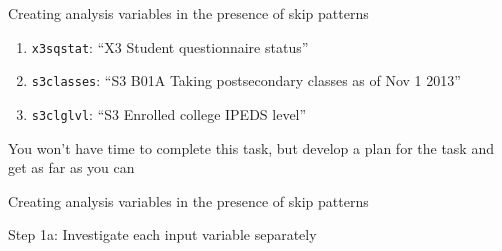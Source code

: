 \documentclass[8pt,ignorenonframetext,dvipsnames]{beamer}
\newenvironment{Shaded}{\begin{snugshade}}{\end{snugshade}}
\newcommand{\KeywordTok}[1]{\textcolor[rgb]{0.13,0.29,0.53}{\textbf{#1}}}
\newcommand{\StringTok}[1]{\textcolor[rgb]{0.31,0.60,0.02}{#1}}
\newcommand{\CommentTok}[1]{\textcolor[rgb]{0.56,0.35,0.01}{\textit{#1}}}
\newcommand{\OperatorTok}[1]{\textcolor[rgb]{0.81,0.36,0.00}{\textbf{#1}}}
\newcommand{\NormalTok}[1]{#1}
\providecommand{\tightlist}{%
  \setlength{\itemsep}{0pt}\setlength{\parskip}{0pt}}
\renewcommand{\textbf}[1]{{\color{darkgray}\bfseries\fontfamily{Montserrat-TOsF}#1}}
\begin{document}
\begin{frame}[fragile]{Creating analysis variables in the presence of
skip patterns}
\begin{itemize}
  \begin{enumerate}
  \def\labelenumi{\arabic{enumi}.}
  \tightlist
  \item
    \texttt{x3sqstat}: ``X3 Student questionnaire status''
  \item
    \texttt{s3classes}: ``S3 B01A Taking postsecondary classes as of Nov
    1 2013''
  \item
    \texttt{s3clglvl}: ``S3 Enrolled college IPEDS level''
  \end{enumerate}
\end{itemize}

\begin{Shaded}
\end{Shaded}

You won't have time to complete this task, but develop a plan for the
task and get as far as you can

\end{frame}

\begin{frame}[fragile]{Creating analysis variables in the presence of
skip patterns}

Step 1a: Investigate each input variable separately

\begin{Shaded}
\end{Shaded}

\end{frame}
\end{document}
